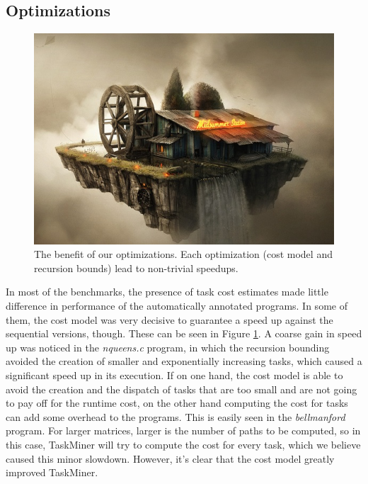 \documentclass[sigplan,10pt,review,anonymous]{acmart}
\newcommand\Taskminer{\mbox{\textsf{TaskMiner}}}
\begin{document}
\subsection{Optimizations}
\label{sub:optimizations}

\begin{figure}[htb]
\begin{center}
\includegraphics[width=1\columnwidth]{images/Stub}
\caption{The benefit of our optimizations.
Each optimization (cost model and recursion bounds) lead to
non-trivial speedups.}
\label{fig:Opt_Speedups}
\end{center}
\end{figure}

In most of the benchmarks, the presence of task cost estimates made little difference in performance of
the automatically annotated programs. In some of them, the cost model was very decisive to 
guarantee a speed up against the sequential versions, though. These can be seen in Figure \ref{fig:Opt_Speedups}.
A coarse gain in speed up was noticed in the \textit{nqueens.c} program, in which the recursion bounding
avoided the creation of smaller and exponentially increasing tasks, which caused a significant speed
up in its execution. 
If on one hand, the cost model is able to avoid the creation and the dispatch of tasks that are too small
and are not going to pay off for the runtime cost, on the other hand computing the cost for tasks can add
some overhead to the programs. This is easily seen in the \textit{bellmanford} program. For larger
matrices, larger is the number of paths to be computed, so in this case, {\Taskminer} will try to
compute the cost for every task, which we believe caused this minor slowdown. However, it's
clear that the cost model greatly improved {\Taskminer}.
\end{document}
